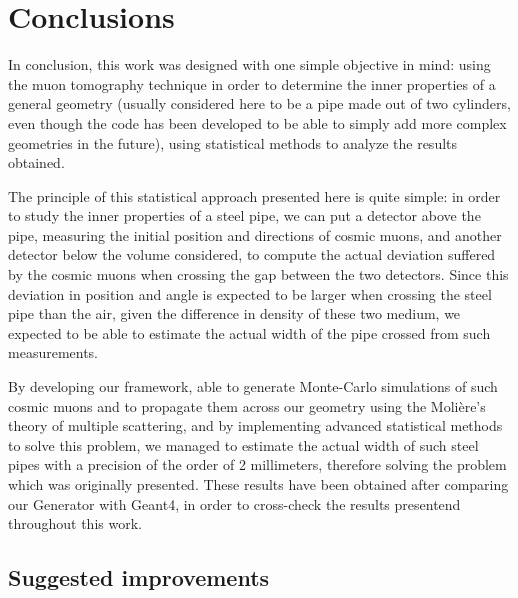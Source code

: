 \documentclass[a4paper, 11pt]{report}
\begin{document}

\chapter{Conclusions}

In conclusion, this work was designed with one simple objective in mind: using the muon tomography technique in order to determine the inner properties of a general geometry (usually considered here to be a pipe made out of two cylinders, even though the code has been developed to be able to simply add more complex geometries in the future), using statistical methods to analyze the results obtained.

The principle of this statistical approach presented here is quite simple: in order to study the inner properties of a steel pipe, we can put a detector above the pipe, measuring the initial position and directions of cosmic muons, and another detector below the volume considered, to compute the actual deviation suffered by the cosmic muons when crossing the gap between the two detectors. Since this deviation in position and angle is expected to be larger when crossing the steel pipe than the air, given the difference in density of these two medium, we expected to be able to estimate the actual width of the pipe crossed from such measurements. 

By developing our framework, able to generate Monte-Carlo simulations of such cosmic muons and to propagate them across our geometry using the Moli\`ere's theory of multiple scattering, and by implementing advanced statistical methods to solve this problem, we managed to estimate the actual width of such steel pipes with a precision of the order of 2 millimeters, therefore solving the problem which was originally presented. These results have been obtained after comparing our Generator with Geant4, in order to cross-check the results presentend throughout this work.

\section{Suggested improvements}
\end{document}
